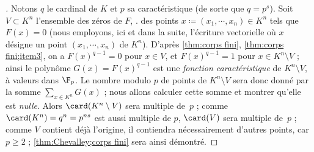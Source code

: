 \documentclass[11pt, useosf,
  title in boldface,
  theorem in new line,
  theorem numbering = section,
  number theorems separately,
]{simplivre}
\begin{document}
    \begin{proof}[{Démonstration \cref[de]{thm:Chevalley;corps fini}}]
        Notons \( q \) le cardinal de \( K \) et \( p \) sa caractéristique (de sorte que \( q = p^s \)). Soit \( V \subset K^n \) l'ensemble des zéros de \( F \), \ie. des points \( x \coloneqq (x_1, \cdots, x_n) \in K^n \) tels que \( F(x) = 0 \) (nous employons, ici et dans la suite, l'écriture vectorielle où \( x \) désigne un point \( (x_1, \cdots, x_n) \) de \( K^n \)). D'après \cref{thm:corps fini}, \ref{thm:corps fini;item3}, on a \( F(x)^{q-1} = 0 \) pour \( x \in V \), et \( F(x)^{q-1} = 1 \) pour \( x \in K^n \setminus V \) ; ainsi le polynôme \( G(x) = F(x)^{q-1} \) est une \emph{fonction caractéristique} de \( K^n \setminus V \), à valeurs dans \( \F_p \). Le nombre modulo \( p \) de points de \( K^n \setminus V \) sera donc donné par la somme \( \sum_{x \in K^n} G(x) \) ; nous allons calculer cette somme et montrer qu'elle est \emph{nulle}. Alors \( \card(K^n \setminus V) \) sera multiple de~\( p \) ; comme \( \card(K^n) = q^n = p^{ns} \) est aussi multiple de \( p \), \( \card(V) \) sera multiple de~\( p \) ; comme \( V \) contient déjà l'origine, il contiendra nécessairement d'autres points, car \( p \geqslant 2 \) ; \cref{thm:Chevalley;corps fini} sera ainsi démontré.


\end{proof}
\end{document}
